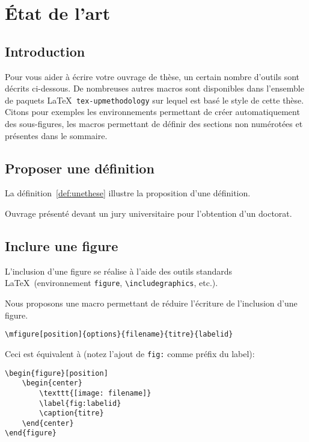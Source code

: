 \documentclass[french]{spimubphdthesis}
\begin{document}
\chapter{\'Etat de l'art}

\section{Introduction}

Pour vous aider à écrire votre ouvrage de thèse, un certain nombre d'outils sont décrits ci-dessous.
De nombreuses autres macros sont disponibles dans l'ensemble de paquets \LaTeX\ \texttt{tex-upmethodology}
sur lequel est basé le style de cette thèse. Citons pour exemples les environnements permettant de créer
automatiquement des sous-figures, les macros permettant de définir des sections non numérotées et présentes
dans le sommaire.

\section{Proposer une définition}

La définition~\ref{def:unethese} illustre la proposition d'une définition.

\begin{definition} \label{def:unethese}
Ouvrage présenté devant un jury universitaire pour l'obtention d'un doctorat.
\end{definition}

\section{Inclure une figure}

L'inclusion d'une figure se réalise à l'aide des outils standards \LaTeX\ (environnement \texttt{figure}, \texttt{{\textbackslash}includegraphics}, etc.).

Nous proposons une macro permettant de réduire l'écriture de l'inclusion d'une figure.

\begin{verbatim}
\mfigure[position]{options}{filename}{titre}{labelid}
\end{verbatim}

Ceci est équivalent à (notez l'ajout de \texttt{fig:} comme préfix du label):
\begin{verbatim}
\begin{figure}[position]
	\begin{center}
		\texttt{[image: filename]}
		\label{fig:labelid}
		\caption{titre}
	\end{center}
\end{figure}
\end{verbatim}
\end{document}
